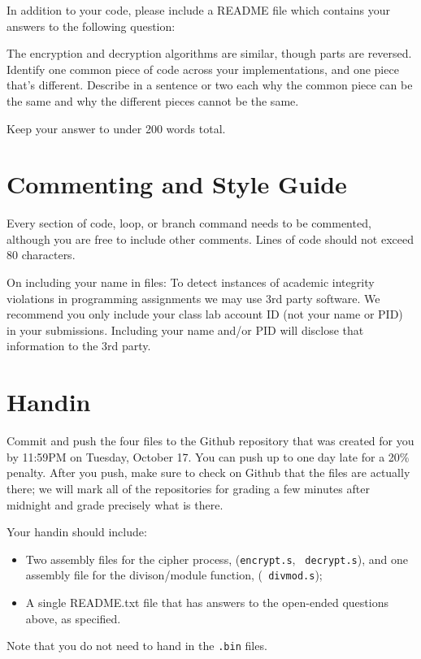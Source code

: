 \documentclass{article}
\begin{document}
In addition to your code, please include a README file which contains your
answers to the following question:

The encryption and decryption algorithms are similar, though parts are
reversed. Identify one common piece of code across your implementations, and
one piece that's different. Describe in a sentence or two each why the common
piece can be the same and why the different pieces cannot be the same.

Keep your answer to under 200 words total.

\section{Commenting and Style Guide}

Every section of code, loop, or branch command needs to be commented, although
you are free to include other comments. Lines of code should not exceed 80
characters.

On including your name in files: To detect instances of academic integrity
violations in programming assignments we may use 3rd party software.  We
recommend you only include your class lab account ID (not your name or PID) in
your submissions.  Including your name and/or PID will disclose that
information to the 3rd party.

\section{Handin}

Commit and push the four files to the Github repository that was created
for you by 11:59PM on Tuesday, October 17. You can push up to one day late for
a 20\% penalty. After you push, make sure to check on Github that the files are
actually there; we will mark all of the repositories for grading a few minutes
after midnight and grade precisely what is there.

Your handin should include:

\begin{itemize}
\item Two assembly files for the cipher process, ({\tt encrypt.s}, {\tt 
decrypt.s}), and one assembly file for the divison/module function, ({\tt 
divmod.s}); 
\item A single README.txt file that has answers to the open-ended questions
above, as specified.
\end{itemize}

Note that you do not need to hand in the {\tt .bin} files.
\end{document}
